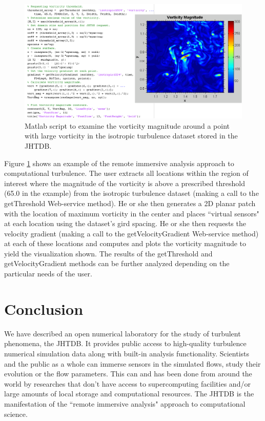 \documentclass[10pt,twocolumn]{article}
\begin{document}
\begin{figure}
\includegraphics[width=1.0\textwidth]{vorticity.png}
\caption{Matlab script to examine the vorticity magnitude around a point with large vorticity in the isotropic turbulence dataset stored in the JHTDB.}
\label{fig:vorticity}
\end{figure}

Figure \ref{fig:vorticity} shows an example of the remote immersive analysis approach to computational turbulence. The user extracts all locations within the
region of interest where the magnitude of the vorticity is above a prescribed threshold (65.0 in the example) from the isotropic turbulence dataset (making 
a call to the getThreshold Web-service method). He or she then generates a 2D planar patch with the location of maximum vorticity in the center and places
``virtual sensors" at each location using the dataset's gird spacing. He or she then requests the velocity gradient (making a call to the getVelocityGradient
Web-service method) at each of these locations and computes and plots the vorticity magnitude to yield the visualization shown. The results of the 
getThreshold and getVelocityGradient methods can be further analyzed depending on the particular needs of the user.

\section{Conclusion}
We have described an open numerical laboratory for the study of turbulent phenomena, the JHTDB. It provides public access to high-quality turbulence 
numerical simulation data along with built-in analysis functionality. Scientists and the public as a whole can immerse sensors in the simulated flows, study
their evolution or the flow parameters. This can and has been done from around the world by researches that don't have access to supercomputing facilities
and/or large amounts of local storage and computational resources. The JHTDB is the manifestation of the ``remote immersive analysis" approach to 
computational science.
\end{document}
